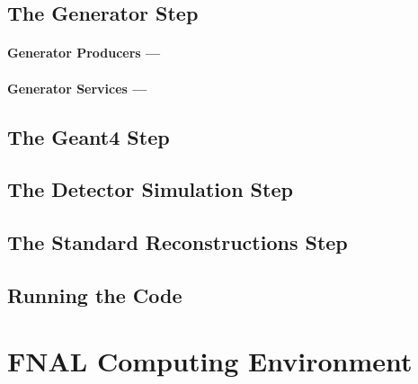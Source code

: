 \documentclass[8pt]{refart}
\begin{document}
\subsection{The Generator Step}



\paragraph{Generator Producers ---}


\paragraph{Generator Services ---}

\subsection{The Geant4 Step}



\subsection{The Detector Simulation Step}

\subsection{The Standard Reconstructions Step}

\subsection{Running the Code}\label{runningthecode}




\newpage


\printbibliography

\newpage
\appendix

\section{FNAL Computing Environment}
\end{document}
